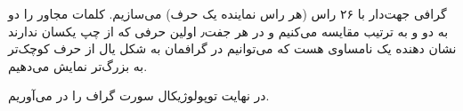 %	

گرافی جهت‌دار با ۲۶ راس (هر راس نماینده یک حرف) می‌سازیم.
کلمات مجاور را دو به دو و به ترتیب مقایسه می‌کنیم و در هر جفت٫ اولین حرفی که از چپ یکسان ندارند نشان دهنده یک نامساوی هست که می‌توانیم در گرافمان به شکل یال از حرف کوچک‌تر به بزرگ‌تر نمایش می‌دهیم. 

در نهایت توپولوژیکال سورت گراف را در می‌آوریم.